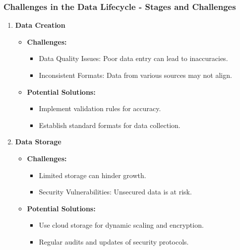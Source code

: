 \documentclass[aspectratio=169]{beamer}
\begin{document}
\begin{frame}[fragile]
  \frametitle{Challenges in the Data Lifecycle - Stages and Challenges}

  \begin{enumerate}
    \item \textbf{Data Creation}
      \begin{itemize}
        \item \textbf{Challenges:}
          \begin{itemize}
            \item Data Quality Issues: Poor data entry can lead to inaccuracies.
            \item Inconsistent Formats: Data from various sources may not align.
          \end{itemize}
        \item \textbf{Potential Solutions:}
          \begin{itemize}
            \item Implement validation rules for accuracy.
            \item Establish standard formats for data collection.
          \end{itemize}
      \end{itemize}
      
    \item \textbf{Data Storage}
      \begin{itemize}
        \item \textbf{Challenges:} 
          \begin{itemize}
            \item Limited storage can hinder growth.
            \item Security Vulnerabilities: Unsecured data is at risk.
          \end{itemize}
        \item \textbf{Potential Solutions:} 
          \begin{itemize}
            \item Use cloud storage for dynamic scaling and encryption.
            \item Regular audits and updates of security protocols.
          \end{itemize}
      \end{itemize}
  \end{enumerate}
  
\end{frame}
\end{document}
